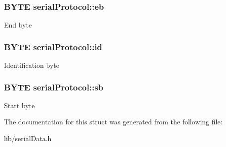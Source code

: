 \subsubsection[{eb}]{\setlength{\rightskip}{0pt plus 5cm}B\+Y\+T\+E serial\+Protocol\+::eb}\label{structserial_protocol_af8e01f5811bdc9a2906aceed9ae19f0f}
End byte \hypertarget{structserial_protocol_a76964847a69881951e9da1317cc17571}{}
\subsubsection[{id}]{\setlength{\rightskip}{0pt plus 5cm}B\+Y\+T\+E serial\+Protocol\+::id}\label{structserial_protocol_a76964847a69881951e9da1317cc17571}
Identification byte \hypertarget{structserial_protocol_af8bbcf22377b98dadf690666f9d48156}{}
\subsubsection[{sb}]{\setlength{\rightskip}{0pt plus 5cm}B\+Y\+T\+E serial\+Protocol\+::sb}\label{structserial_protocol_af8bbcf22377b98dadf690666f9d48156}
Start byte 

The documentation for this struct was generated from the following file\+:\begin{DoxyCompactItemize}
\item 
lib/serial\+Data.\+h\end{DoxyCompactItemize}
